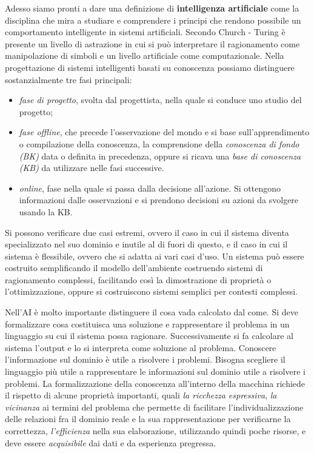 \documentclass[a4paper]{extarticle}
\begin{document}
Adesso siamo pronti a dare una definizione di \textbf{intelligenza artificiale} come la disciplina che mira a studiare e comprendere i principi che rendono possibile un comportamento intelligente in sistemi artificiali. Secondo Church - Turing è presente un livello di astrazione in cui si può interpretare il ragionamento come manipolazione di simboli e un livello artificiale come computazionale. Nella progettazione di sistemi intelligenti basati su conoscenza possiamo distinguere sostanzialmente tre fasi principali:
\begin{itemize}
\item \textit{fase di progetto}, svolta dal progettista, nella quale si conduce uno studio del progetto;
\item \textit{fase offline}, che precede l'osservazione del mondo e si base sull'apprendimento o compilazione della conoscenza, la comprensione della \textit{conoscenza di fondo (BK)} data o definita in precedenza, oppure si ricava una \textit{base di conoscenza (KB)} da utilizzare nelle fasi successive.
\item \textit{online}, fase nella quale si passa dalla decisione all'azione. Si ottengono informazioni dalle osservazioni e si prendono decisioni su azioni da svolgere usando la KB.
\end{itemize}

Si possono verificare due casi estremi, ovvero il caso in cui il sistema diventa specializzato nel suo dominio e inutile al di fuori di questo, e il caso in cui il sistema è flessibile, ovvero che si adatta ai vari casi d'uso. Un sistema può essere costruito semplificando il modello dell'ambiente costruendo sistemi di ragionamento complessi, facilitando così la dimostrazione di proprietà o l'ottimizzazione, oppure si costruiscono sistemi semplici per contesti complessi.

Nell'AI è molto importante distinguere il cosa vada calcolato dal come. Si deve formalizzare cosa costituisca una soluzione e rappresentare il problema in un linguaggio su cui il sistema possa ragionare. Successivamente si fa calcolare al sistema l'output e lo si interpreta come soluzione al problema.
Conoscere l'informazione sul dominio è utile a risolvere i problemi. Bisogna scegliere il linguaggio più utile a rappresentare le informazioni sul dominio utile a risolvere i problemi. La formalizzazione della conoscenza all'interno della macchina richiede il rispetto di alcune proprietà importanti, quali \textit{la ricchezza espressiva}, \textit{la vicinanza} ai termini del problema che permette di facilitare l'individualizzazione delle relazioni fra il dominio reale e la sua rappresentazione per verificarne la correttezza, \textit{l'efficienza} nella sua elaborazione, utilizzando quindi poche risorse, e deve essere \textit{acquisibile} dai dati e da esperienza pregressa.
\end{document}
